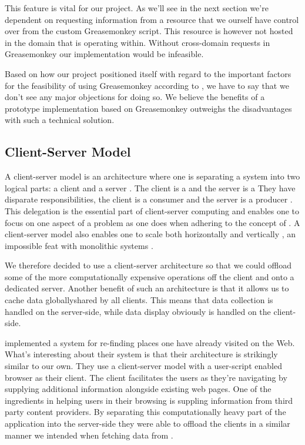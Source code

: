 This feature is vital for our project. As we'll see in the next section we're
dependent on requesting information from a resource that we ourself have
control over from the custom Greasemonkey script. This resource is however
not hosted in the domain that \urort{} is operating within. Without
cross-domain requests in Greasemonkey our implementation would be infeasible.

Based on how our project positioned itself with regard to the important
factors for the feasibility of using Greasemonkey
according to \citet{laird07}, we have to say that we
don't see any major objections for doing so.
We believe the benefits of a prototype implementation
based on Greasemonkey outweighs the disadvantages with such a technical
solution.

\subsection{Client-Server Model}

A client-server model is an architecture where one is separating a system into
two logical parts: a client and a server \citep[]{lewandowski98}. The
client is a 
and the server is a 
They have disparate responsibilities, the client is a consumer and the
server is a producer \citep[]{lewandowski98}. This delegation is the
essential part of client-server computing and enables one to focus on one
aspect of a problem as one does when adhering to the concept of
 \citep[]{dijkstra82}.
A client-server model also enables one to scale both horizontally and
vertically%
,
an impossible feat with monolithic systems \citep[]{lewandowski98}.

We therefore decided to use a client-server architecture so that we could
offload some of the more computationally expensive operations off the client
and onto a dedicated server. Another benefit of such an architecture is that
it allows us to cache data globally\dash{}shared by all clients. This means
that data collection is handled on the server-side, while data display
obviously is handled on the client-side.

\citet[--888]{nishimoto06} implemented a system for re-finding places one
have already visited on the Web. What's interesting about their system is that
their architecture is strikingly similar to our own. They use a
client-server model with a user-script enabled browser as their client. The
client facilitates the users as they're navigating by supplying additional
information alongside existing web pages. One of the ingredients in helping
users in their browsing is suppling information from third party content
providers. By separating this computationally heavy part of the application
into the server-side they were able to offload the clients in a similar
manner we intended when fetching data from \urort{}.

